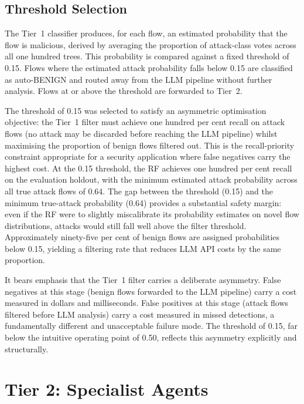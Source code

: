 \subsection{Threshold Selection}
\label{sec:threshold-selection}

The Tier~1 classifier produces, for each flow, an estimated probability that the flow is malicious, derived by averaging the proportion of attack-class votes across all one hundred trees. This probability is compared against a fixed threshold of 0.15. Flows where the estimated attack probability falls below 0.15 are classified as auto-BENIGN and routed away from the LLM pipeline without further analysis. Flows at or above the threshold are forwarded to Tier~2.

The threshold of 0.15 was selected to satisfy an asymmetric optimisation objective: the Tier~1 filter must achieve one hundred per cent recall on attack flows (no attack may be discarded before reaching the LLM pipeline) whilst maximising the proportion of benign flows filtered out. This is the recall-priority constraint appropriate for a security application where false negatives carry the highest cost. At the 0.15 threshold, the RF achieves one hundred per cent recall on the evaluation holdout, with the minimum estimated attack probability across all true attack flows of 0.64. The gap between the threshold (0.15) and the minimum true-attack probability (0.64) provides a substantial safety margin: even if the RF were to slightly miscalibrate its probability estimates on novel flow distributions, attacks would still fall well above the filter threshold. Approximately ninety-five per cent of benign flows are assigned probabilities below 0.15, yielding a filtering rate that reduces LLM API costs by the same proportion.

It bears emphasis that the Tier~1 filter carries a deliberate asymmetry. False negatives at this stage (benign flows forwarded to the LLM pipeline) carry a cost measured in dollars and milliseconds. False positives at this stage (attack flows filtered before LLM analysis) carry a cost measured in missed detections, a fundamentally different and unacceptable failure mode. The threshold of 0.15, far below the intuitive operating point of 0.50, reflects this asymmetry explicitly and structurally.

\section{Tier 2: Specialist Agents}
\label{sec:tier2-specialists}

